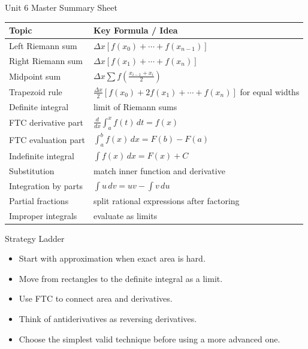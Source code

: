 \documentclass[11pt]{article}
\begin{document}
\begin{summarybox}{Unit 6 Master Summary Sheet}
\renewcommand{\arraystretch}{1.35}
\begin{tabularx}{\textwidth}{@{}p{}X@{}}
\toprule
\textbf{Topic} & \textbf{Key Formula / Idea} \\
\midrule
Left Riemann sum & \(\Delta x[f(x_0)+\cdots+f(x_{n-1})]\) \\

Right Riemann sum & \(\Delta x[f(x_1)+\cdots+f(x_n)]\) \\

Midpoint sum & \(\Delta x\sum f\!\left(\frac{x_{i-1}+x_i}{2}\right)\) \\

Trapezoid rule & \(\frac{\Delta x}{2}[f(x_0)+2f(x_1)+\cdots+f(x_n)]\) for equal widths \\

Definite integral & limit of Riemann sums \\

FTC derivative part & \(\frac{d}{dx}\int_a^x f(t)\,dt=f(x)\) \\

FTC evaluation part & \(\int_a^b f(x)\,dx=F(b)-F(a)\) \\

Indefinite integral & \(\int f(x)\,dx=F(x)+C\) \\

Substitution & match inner function and derivative \\

Integration by parts & \(\int u\,dv=uv-\int v\,du\) \\

Partial fractions & split rational expressions after factoring \\

Improper integrals & evaluate as limits \\
\bottomrule
\end{tabularx}
\end{summarybox}

\vspace{1em}

\begin{summarybox}{Strategy Ladder}
\begin{itemize}
    \item Start with approximation when exact area is hard.
    \item Move from rectangles to the definite integral as a limit.
    \item Use FTC to connect area and derivatives.
    \item Think of antiderivatives as reversing derivatives.
    \item Choose the simplest valid technique before using a more advanced one.
\end{itemize}
\end{summarybox}
\end{document}
